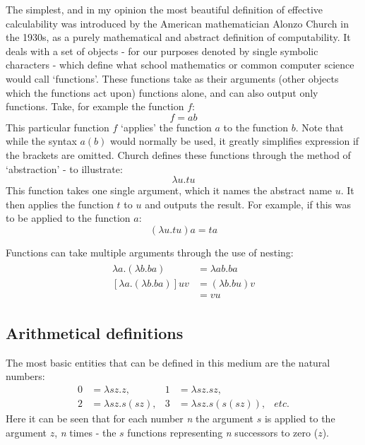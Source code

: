 \documentclass[Master.tex]{subfiles}
\begin{document}
The simplest, and in my opinion the most beautiful definition of effective calculability was introduced by the American mathematician Alonzo Church in the 1930s, as a purely mathematical and abstract definition of computability. It deals with a set of objects - for our purposes denoted by single symbolic characters - which define what school mathematics or common computer science would call `functions'. These functions take as their arguments (other objects which the functions act upon) functions alone, and can also output only functions. Take, for example the function $f$:
\begin{equation*}
f = ab
\end{equation*}
This particular function $f$ `applies' the function $a$ to the function $b$. Note that while the syntax $a(b)$ would normally be used, it greatly simplifies expression if the brackets are omitted. Church defines these functions through the method of `abstraction' - to illustrate:
\begin{equation*}
\lambda u.tu
\end{equation*}
This function takes one single argument, which it names the abstract name $u$. It then applies the function $t$ to $u$ and outputs the result. For example, if this was to be applied to the function $a$:
\begin{equation*}
(\lambda u.tu) a = ta	
\end{equation*}

Functions can take multiple arguments through the use of nesting:
\begin{gather*}
\begin{aligned}
\lambda a.(\lambda b.ba) &=  \lambda ab.ba \\
[\lambda a.(\lambda b.ba)]uv &= (\lambda b.bu)v \\ &= vu
\end{aligned}
\end{gather*}

\subsection{Arithmetical definitions}

The most basic entities that can be defined in this medium are the natural numbers:
\cite{church1941lambda}
\begin{equation*}
\begin{aligned}
\bm{\mathrm{0}} &= \lambda sz.z,
  & %
\bm{\mathrm{1}} &= \lambda sz.sz,
  \\
\bm{\mathrm{2}} &= \lambda sz.s(sz),
  &
\bm{\mathrm{3}} &= \lambda sz.s(s(sz)),
  &
etc.
\end{aligned}
\end{equation*}
Here it can be seen that for each number \textit{n} the argument $s$ is applied to the argument $z$, \textit{n} times - the $s$ functions representing \textit{n} successors to zero ($z$).
\end{document}
